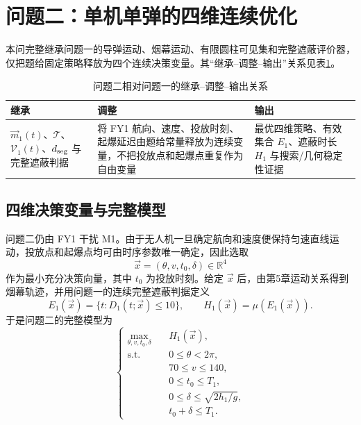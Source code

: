 \section{问题二：单机单弹的四维连续优化}

本问完整继承问题一的导弹运动、烟幕运动、有限圆柱可见集和完整遮蔽评价器，仅把题给固定策略释放为四个连续决策变量。其“继承--调整--输出”关系见表\ref{tab:q2-inherit}。

\begin{table}[tbp]
\centering
\caption{问题二相对问题一的继承--调整--输出关系}
\label{tab:q2-inherit}
\small
\begin{tabularx}{\textwidth}{p{} X X}
\toprule
\textbf{继承} & \textbf{调整} & \textbf{输出} \\
\midrule
$\vec m_1(t)$、$\mathcal T$、$\mathcal V_1(t)$、$d_{\rm seg}$ 与完整遮蔽判据 & 将 FY1 航向、速度、投放时刻、起爆延迟由题给常量释放为连续变量，不把投放点和起爆点重复作为自由变量 & 最优四维策略、有效集合 $E_1$、遮蔽时长 $H_1$ 与搜索/几何稳定性证据 \\
\bottomrule
\end{tabularx}
\end{table}

\subsection{四维决策变量与完整模型}
问题二仍由 FY1 干扰 M1。由于无人机一旦确定航向和速度便保持匀速直线运动，投放点和起爆点均可由时序参数唯一确定，因此选取
\begin{equation}
\vec x=(\theta,v,t_0,\delta)\in\mathbb R^4
\label{eq:q2-x}
\end{equation}
作为最小充分决策向量，其中 $t_0$ 为投放时刻。给定 $\vec x$ 后，由第5章运动关系得到烟幕轨迹，并用问题一的连续完整遮蔽判据定义
\begin{equation}
E_1(\vec x)=\{t:D_1(t;\vec x)\le10\},
\qquad
H_1(\vec x)=\mu(E_1(\vec x)).
\label{eq:q2-obj}
\end{equation}
于是问题二的完整模型为
\begin{equation}
\left\{
\begin{aligned}
\max_{\theta,v,t_0,\delta}\quad & H_1(\vec x),\\
\text{s.t.}\quad
&0\le\theta<2\pi,\\
&70\le v\le140,\\
&0\le t_0\le T_1,\\
&0\le\delta\le\sqrt{2h_1/g},\\
&t_0+\delta\le T_1.
\end{aligned}
\right.
\label{eq:q2-model}
\end{equation}

